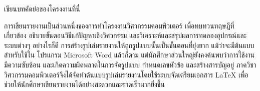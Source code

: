 \maketitle
\makesignature

\ifproject
\begin{abstractTH}
เขียนบทคัดย่อของโครงงานที่นี่

การเขียนรายงานเป็นส่วนหนึ่งของการทำโครงงานวิศวกรรมคอมพิวเตอร์
เพื่อทบทวนทฤษฎีที่เกี่ยวข้อง อธิบายขั้นตอนวิธีแก้ปัญหาเชิงวิศวกรรม และวิเคราะห์และสรุปผลการทดลองอุปกรณ์และระบบต่างๆ
\newline อย่างไรก็ดี การสร้างรูปเล่มรายงานให้ถูกรูปแบบนั้นเป็นขั้นตอนที่ยุ่งยาก
แม้ว่าจะมีต้นแบบสำหรับใช้ใน
\newline โปรแกรม Microsoft Word แล้วก็ตาม
แต่นักศึกษาส่วนใหญ่ยังคงค้นพบว่าการใช้งานมีความซับซ้อน และเกิดความผิดพลาดในการจัดรูปแบบ กำหนดเลขหัวข้อ และสร้างสารบัญอยู่
\enskip ภาควิชาวิศวกรรมคอมพิวเตอร์จึงได้จัดทำต้นแบบรูปเล่มรายงานโดยใช้ระบบจัดเตรียมเอกสาร
\LaTeX{} เพื่อช่วยให้นักศึกษาเขียนรายงานได้อย่างสะดวกและรวดเร็วมากยิ่งขึ้น
\end{abstractTH}







\contentspage

\ifproject

\fi %



